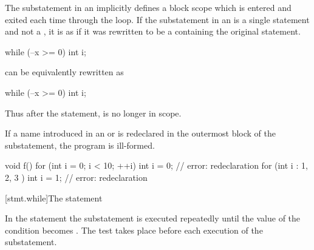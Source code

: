 \pnum
{}%
The substatement in an  implicitly defines
a block scope which is entered and exited each time
through the loop.
If the substatement in an  is
a single statement and not a ,
it is as if it was rewritten to be
a  containing the original statement.
\begin{example}

\begin{codeblock}
while (--x >= 0)
  int i;
\end{codeblock}

can be equivalently rewritten as

\begin{codeblock}
while (--x >= 0) {
  int i;
}
\end{codeblock}

Thus after the  statement,  is no longer in scope.
\end{example}

\pnum
If a name introduced in an
 or 
is redeclared in the outermost block of the substatement, the program is ill-formed.
\begin{example}
\begin{codeblock}
void f() {
  for (int i = 0; i < 10; ++i)
    int i = 0;          // error: redeclaration
  for (int i : { 1, 2, 3 })
    int i = 1;          // error: redeclaration
}
\end{codeblock}
\end{example}

[stmt.while]{The  statement}%

\pnum
In the  statement the substatement is executed repeatedly
until the value of the condition becomes
. The test takes place before each execution of the
substatement.

